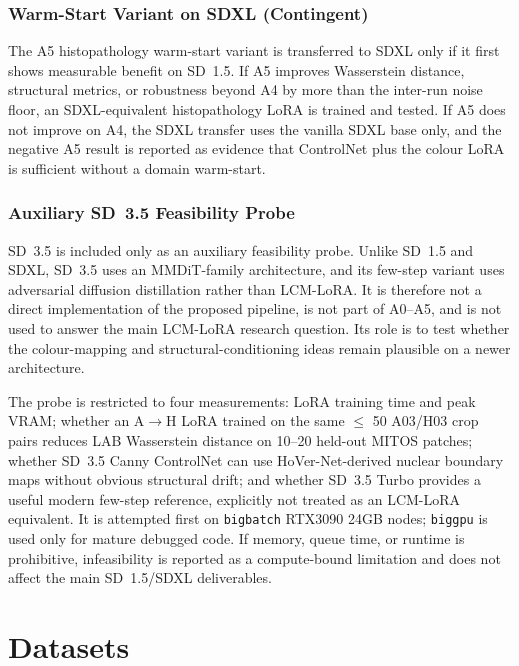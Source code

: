 \documentclass[a4paper,twoside,12pt]{report}
\begin{document}
\subsubsection{Warm-Start Variant on SDXL (Contingent)}
\label{sec:sdxl_a5}

The A5 histopathology warm-start variant is transferred to SDXL only if it first shows measurable benefit on SD~1.5. If A5 improves Wasserstein distance, structural metrics, or robustness beyond A4 by more than the inter-run noise floor, an SDXL-equivalent histopathology LoRA is trained and tested. If A5 does not improve on A4, the SDXL transfer uses the vanilla SDXL base only, and the negative A5 result is reported as evidence that ControlNet plus the colour LoRA is sufficient without a domain warm-start.

\subsubsection{Auxiliary SD~3.5 Feasibility Probe}
\label{sec:sd35_probe}

SD~3.5 is included only as an auxiliary feasibility probe. Unlike SD~1.5 and SDXL, SD~3.5 uses an MMDiT-family architecture, and its few-step variant uses adversarial diffusion distillation rather than LCM-LoRA. It is therefore not a direct implementation of the proposed pipeline, is not part of A0--A5, and is not used to answer the main LCM-LoRA research question. Its role is to test whether the colour-mapping and structural-conditioning ideas remain plausible on a newer architecture.

The probe is restricted to four measurements: LoRA training time and peak VRAM; whether an A$\rightarrow$H LoRA trained on the same $\leq$ 50 A03/H03 crop pairs reduces LAB Wasserstein distance on 10--20 held-out MITOS patches; whether SD~3.5 Canny ControlNet can use HoVer-Net-derived nuclear boundary maps without obvious structural drift; and whether SD~3.5 Turbo provides a useful modern few-step reference, explicitly not treated as an LCM-LoRA equivalent. It is attempted first on \texttt{bigbatch} RTX3090 24GB nodes; \texttt{biggpu} is used only for mature debugged code. If memory, queue time, or runtime is prohibitive, infeasibility is reported as a compute-bound limitation and does not affect the main SD~1.5/SDXL deliverables.

\section{Datasets}
\label{sec:datasets}
\end{document}
